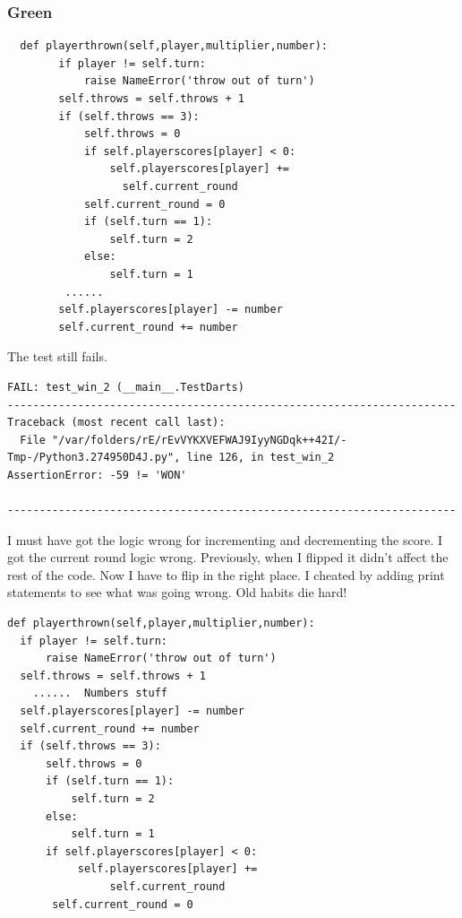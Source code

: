 \documentclass{beamer}
\begin{document}
\begin{frame}[fragile]
\frametitle{Green}
\begin{lstlisting}
  def playerthrown(self,player,multiplier,number):
        if player != self.turn:
            raise NameError('throw out of turn')
        self.throws = self.throws + 1
        if (self.throws == 3):
            self.throws = 0
            if self.playerscores[player] < 0:
                self.playerscores[player] += 
                  self.current_round                
            self.current_round = 0
            if (self.turn == 1):
                self.turn = 2
            else:
                self.turn = 1
         ...... 
        self.playerscores[player] -= number
        self.current_round += number
\end{lstlisting}
  
\end{frame}
\begin{frame}[fragile]
The test still fails.
\begin{verbatim}
FAIL: test_win_2 (__main__.TestDarts)
----------------------------------------------------------------------
Traceback (most recent call last):
  File "/var/folders/rE/rEvVYKXVEFWAJ9IyyNGDqk++42I/-Tmp-/Python3.274950D4J.py", line 126, in test_win_2
AssertionError: -59 != 'WON'

----------------------------------------------------------------------
\end{verbatim}
  
 I must have got the logic wrong for incrementing and decrementing the
score. I got the current round logic wrong. Previously, when I flipped it didn't
affect the rest of the code. Now I have to flip in the right place.
I cheated by adding print statements to see what was going wrong. Old
habits die hard!
\end{frame}
\begin{frame}[fragile]
\begin{lstlisting}
def playerthrown(self,player,multiplier,number):
  if player != self.turn:
      raise NameError('throw out of turn')
  self.throws = self.throws + 1
    ......  Numbers stuff
  self.playerscores[player] -= number
  self.current_round += number
  if (self.throws == 3):
      self.throws = 0
      if (self.turn == 1):
          self.turn = 2
      else:
          self.turn = 1
      if self.playerscores[player] < 0:
           self.playerscores[player] +=
                self.current_round
       self.current_round = 0
\end{lstlisting}
\end{frame}
\end{document}
